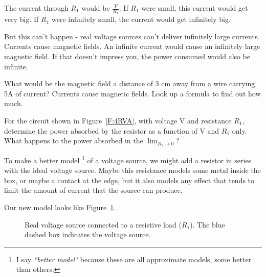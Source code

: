 The current through $R_1$ would be $\frac{V}{R_1}$. If $R_1$ were small, this current would get very big. If $R_1$ were infinitely small, the current would get infinitely big. \par
But this can't happen - real voltage sources can't deliver infinitely large currents. Currents cause magnetic fields. An infinite current would cause an infinitely large magnetic field. If that doesn't impress you, the power consumed would also be infinite.

\begin{blevel}
What would be the magnetic field a distance of 3 cm away from a wire carrying 5A of current? Currents cause magnetic fields. Look up a formula to find out how much.
\end{blevel}

\begin{clevel}
For the circuit shown in Figure~\ref{F:4RVA}, with voltage V and resistance $R_1$, determine the power absorbed by the resistor as a function of V and $R_1$ only. What happens to the power absorbed in the $\lim_{R_1 \to 0}$? 
\end{clevel}

To make a better model \footnote{I say \emph{``better model"} because these are all approximate models, some better than others.} of a voltage source, we might add a resistor in series with the ideal voltage source. Maybe this resistance models some metal inside the box, or maybe a contact at the edge, but it also models any effect that tends to limit the amount of current that the source can produce.
\par
Our new model looks like Figure~\ref{F:4RVB}.

\begin{figure}[H]
\begin{center}
\caption{Real voltage source connected to a resistive load ($R_1$). The blue dashed box indicates the voltage source.}
\label{F:4RVB}
\end{center}
\end{figure}

